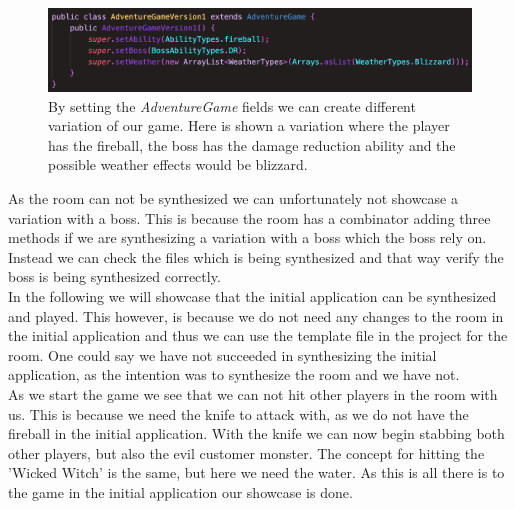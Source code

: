 \begin{figure}
	\centering
	\includegraphics[width=\linewidth]{Materials/Results/AdventureVariation}
	\caption{By setting the \textit{AdventureGame} fields we can create different variation of our game. Here is shown a variation where the player has the fireball, the boss has the damage reduction ability and the possible weather effects would be blizzard.}
	\label{version1}
\end{figure}
As the room can not be synthesized we can unfortunately not showcase a variation with a boss. This is because the room has a combinator adding three methods if we are synthesizing a variation with a boss which the boss rely on. Instead we can check the files which is being synthesized and that way verify the boss is being synthesized correctly. \\
In the following we will showcase that the initial application can be synthesized and played. This however, is because we do not need any changes to the room in the initial application and thus we can use the template file in the project for the room. One could say we have not succeeded in synthesizing the initial application, as the intention was to synthesize the room and we have not.\\
As we start the game we see that we can not hit other players in the room with us. This is because we need the knife to attack with, as we do not have the fireball in the initial application. With the knife we can now begin stabbing both other players, but also the evil customer monster. The concept for hitting the 'Wicked Witch' is the same, but here we need the water. As this is all there is to the game in the initial application our showcase is done.